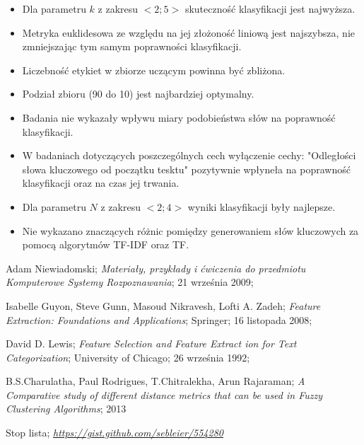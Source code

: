 \documentclass{classrep}
\begin{document}
\begin{itemize}
    \item Dla parametru $k$ z zakresu $<2;5>$ skuteczność klasyfikacji jest najwyższa.
    \item Metryka euklidesowa ze względu na jej złożoność liniową jest najszybsza, nie zmniejszając
            tym samym poprawności klasyfikacji.
    \item Liczebność etykiet w zbiorze uczącym powinna być zbliżona.
    \item Podział zbioru (90 do 10) jest najbardziej optymalny.
    \item Badania nie wykazały wpływu miary podobieństwa słów na poprawność klasyfikacji.
    \item W badaniach dotyczących poszczególnych cech wyłączenie cechy: "Odległości słowa kluczowego
        od początku tesktu" pozytywnie wpłyneła na poprawność klasyfikacji oraz na czas jej trwania.
    \item Dla parametru $N$ z zakresu $<2;4>$ wyniki klasyfikacji były najlepsze.
    \item Nie wykazano znaczących różnic pomiędzy generowaniem słów kluczowych za pomocą algorytmów TF-IDF oraz TF.
\end{itemize}


\begin{thebibliography}{0}

 Adam Niewiadomski;
\textsl{Materiały, przykłady i ćwiczenia do przedmiotu
Komputerowe Systemy Rozpoznawania}; 21 września 2009;

 Isabelle Guyon, Steve Gunn, Masoud Nikravesh, Lofti A. Zadeh;
\textsl{Feature Extraction: Foundations and Applications}; Springer; 16 listopada 2008;

 David D. Lewis;
\textsl{Feature Selection and Feature Extract ion for Text Categorization}; University of Chicago; 26 września 1992;

 B.S.Charulatha, Paul Rodrigues, T.Chitralekha, Arun Rajaraman;
\textsl{A Comparative study of different distance metrics that can be used in Fuzzy Clustering Algorithms}; 2013

 Stop lista;
\textsl{\url{https://gist.github.com/sebleier/554280}}

\end{thebibliography}
\end{document}
